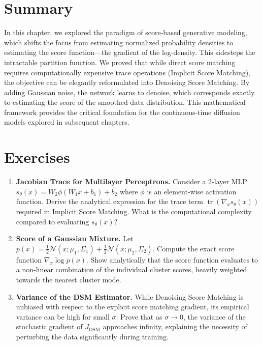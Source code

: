 \section{Summary}
In this chapter, we explored the paradigm of score-based generative modeling, which shifts the focus from estimating normalized probability densities to estimating the score function—the gradient of the log-density. This sidesteps the intractable partition function. We proved that while direct score matching requires computationally expensive trace operations (Implicit Score Matching), the objective can be elegantly reformulated into Denoising Score Matching. By adding Gaussian noise, the network learns to denoise, which corresponds exactly to estimating the score of the smoothed data distribution. This mathematical framework provides the critical foundation for the continuous-time diffusion models explored in subsequent chapters.

\section*{Exercises}
\begin{enumerate}
    \item \textbf{Jacobian Trace for Multilayer Perceptrons.} Consider a 2-layer MLP $s_\theta(x) = W_2 \phi(W_1 x + b_1) + b_2$ where $\phi$ is an element-wise activation function. Derive the analytical expression for the trace term $\operatorname{tr}(\nabla_x s_\theta(x))$ required in Implicit Score Matching. What is the computational complexity compared to evaluating $s_\theta(x)$?
    \item \textbf{Score of a Gaussian Mixture.} Let $p(x) = \frac{1}{2}\mathcal{N}(x; \mu_1, \Sigma_1) + \frac{1}{2}\mathcal{N}(x; \mu_2, \Sigma_2)$. Compute the exact score function $\nabla_x \log p(x)$. Show analytically that the score function evaluates to a non-linear combination of the individual cluster scores, heavily weighted towards the nearest cluster mode.
    \item \textbf{Variance of the DSM Estimator.} While Denoising Score Matching is unbiased with respect to the explicit score matching gradient, its empirical variance can be high for small $\sigma$. Prove that as $\sigma \to 0$, the variance of the stochastic gradient of $J_{\text{DSM}}$ approaches infinity, explaining the necessity of perturbing the data significantly during training.
\end{enumerate}


